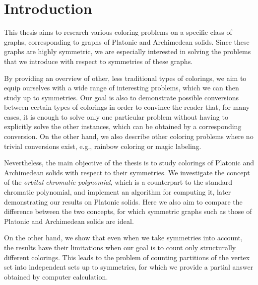 \chapter*{Introduction}

This thesis aims to research various coloring problems on a specific class of graphs, corresponding to graphs of Platonic and Archimedean solids. Since these graphs are highly symmetric, we are especially interested in solving the problems that we introduce with respect to symmetries of these graphs.

By providing an overview of other, less traditional types of colorings, we aim to equip ourselves with a wide range of interesting problems, which we can then study up to symmetries. Our goal is also to demonstrate possible conversions between certain types of colorings in order to convince the reader that, for many cases, it is enough to solve only one particular problem without having to explicitly solve the other instances, which can be obtained by a corresponding conversion. On the other hand, we also describe other coloring problems where no trivial conversions exist, e.g., rainbow coloring or magic labeling.

Nevertheless, the main objective of the thesis is to study colorings of Platonic and Archimedean solids with respect to their symmetries. We investigate the concept of the \emph{orbital chromatic polynomial}, which is a counterpart to the standard chromatic polynomial, and implement an algorithm for computing it, later demonstrating our results on Platonic solids. Here we also aim to compare the difference between the two concepts, for which symmetric graphs such as those of Platonic and Archimedean solids are ideal.

On the other hand, we show that even when we take symmetries into account, the results have their limitations when our goal is to count only structurally different colorings. This leads to the problem of counting partitions of the vertex set into independent sets up to symmetries, for which we provide a partial answer obtained by computer calculation.